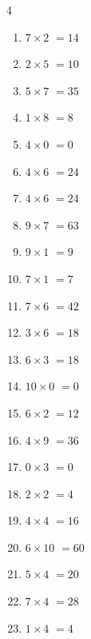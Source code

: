 \begin{multicols}{4}
\begin{enumerate}
  \item $7\times 2$
        $=14$

  \item $2\times 5$
        $=10$

  \item $5\times 7$
        $=35$

  \item $1\times 8$
        $=8$

  \item $4\times 0$
        $=0$

  \item $4\times 6$
        $=24$

\columnbreak %

  \item $4\times 6$
        $=24$

  \item $9\times 7$
        $=63$

  \item $9\times 1$
        $=9$

  \item $7\times 1$
        $=7$

  \item $7\times 6$
        $=42$

  \item $3\times 6$
        $=18$

  \item $6\times 3$
        $=18$

  \item $10\times 0$
        $=0$

  \item $6\times 2$
        $=12$

  \item $4\times 9$
        $=36$

  \item $0\times 3$
        $=0$

  \item $2\times 2$
        $=4$

  \item $4\times 4$
        $=16$

  \item $6\times 10$
        $=60$

  \item $5\times 4$
        $=20$

  \item $7\times 4$
        $=28$

  \item $1\times 4$
        $=4$


\end{enumerate}
\end{multicols}
